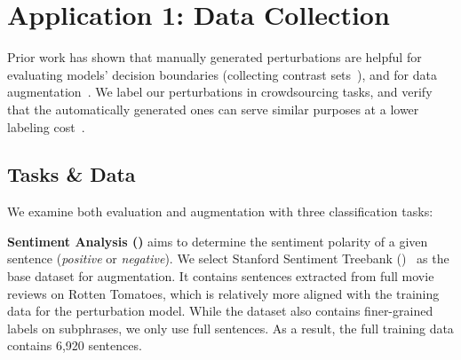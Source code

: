\newcommand{\maug}{\texttt{aug}\xspace}
\newcommand{\mcomp}{\texttt{comp}\xspace}


\section{Application 1: Data Collection}
\label{sec:app_label}




Prior work has shown that manually generated perturbations are helpful for evaluating models' decision boundaries (\eg collecting contrast sets~\cite{gardner2020contrast}), and for data augmentation~\cite{kaushik2019learning, kaushik2020explaining, teney2020learning}.
We label our perturbations in crowdsourcing tasks, and verify that the automatically generated ones can serve similar purposes at a lower labeling cost~\cite{Khashabi2020MoreBF}.

\subsection{Tasks \& Data}

We examine both evaluation and augmentation with three classification tasks: 

\textbf{Sentiment Analysis (\sst)} aims to determine the sentiment polarity of a given sentence (\emph{positive} or \emph{negative}). 
We select Stanford Sentiment Treebank (\dsst)~\cite{socher2013recursive} as the base dataset for augmentation.
It contains sentences extracted from full movie reviews on Rotten Tomatoes, which is relatively more aligned with the training data for the perturbation model. 
While the dataset also contains finer-grained labels on subphrases, we only use full sentences.
As a result, the full training data contains 6,920 sentences.

